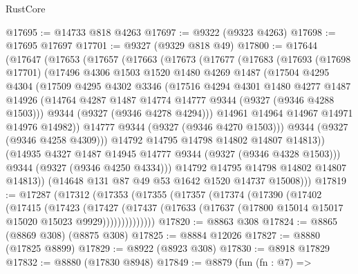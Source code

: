 \begin{lexlean}{RustCore}
\begin{coremodule}
@17695 := @14733 @818 @4263
@17697 := @9322 (@9323 @4263)
@17698 := @17695 @17697
@17701 := @9327 (@9329 @818 @49)
@17800 := @17644
    (@17647
      (@17653
        (@17657
          (@17663
            (@17673
              (@17677
                (@17683
                  (@17693
                    (@17698 @17701)
                    (@17496
                      @4306
                      @1503
                      @1520
                      @1480
                      @4269
                      @1487
                      (@17504
                        @4295
                        @4304
                        (@17509
                          @4295
                          @4302
                          @3346
                          (@17516
                            @4294
                            @4301
                            @1480
                            @4277
                            @1487
                            @14926
                            (@14764 @4287 @1487 @14774 @14777 @9344 (@9327 (@9346 @4288 @1503)))
                            @9344
                            (@9327 (@9346 @4278 @4294)))
                          @14961
                          @14964
                          @14967
                          @14971
                          @14976
                          @14982))
                      @14777
                      @9344
                      (@9327 (@9346 @4270 @1503)))
                    @9344
                    (@9327 (@9346 @4258 @4309)))
                  @14792
                  @14795
                  @14798
                  @14802
                  @14807
                  @14813))
              (@14935 @4327 @1487 @14945 @14777 @9344 (@9327 (@9346 @4328 @1503)))
              @9344
              (@9327 (@9346 @4250 @4334)))
            @14792
            @14795
            @14798
            @14802
            @14807
            @14813))
        (@14648 @131 @87 @49 @53 @1642 @1520 @14737 @15008)))
@17819 := @17287
    (@17312
      (@17353
        (@17355
          (@17357
            (@17374
              (@17390
                (@17402
                  (@17415
                    (@17423
                      (@17427
                        (@17437
                          (@17633 (@17637 (@17800 @15014 @15017 @15020 @15023 @9929))))))))))))))
@17820 := @8863 @308
@17824 := @8865 (@8869 @308) (@8875 @308)
@17825 := @8884 @12026
@17827 := @8880 (@17825 @8899)
@17829 := @8922 (@8923 @308)
@17830 := @8918 @17829
@17832 := @8880 (@17830 @8948)
@17849 := @8879
    (fun (fn : @7) =>

\end{coremodule}
\end{lexlean}
